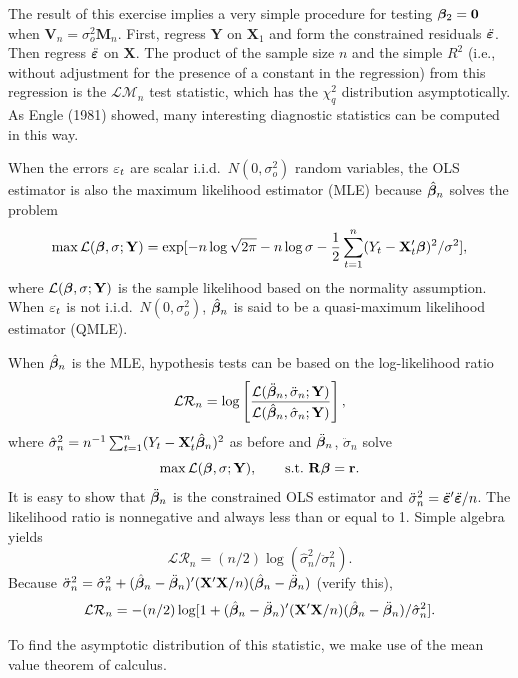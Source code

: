 The result of this exercise implies a very simple procedure for testing
$\boldsymbol{\beta}_2 = \mathbf{0}$ when $\mathbf{V}_n = \sigma_o^2\mathbf{M}_n$. First, regress $\mathbf{Y}$ on $\mathbf{X}_1$ and form the constrained
residuals $\ddot{\boldsymbol{\varepsilon}}$. Then regress $\ddot{\boldsymbol{\varepsilon}}$ on $\mathbf{X}$. The product of the sample size $n$ and the
simple $R^2$ (i.e., without adjustment for the presence of a constant in the
regression) from this regression is the $\mathcal{LM}_n$ test statistic, which has the
$\chi_q^2$ distribution asymptotically. As Engle (1981) showed, many interesting
diagnostic statistics can be computed in this way.

When the errors $\varepsilon_t$ are scalar i.i.d.\ $N(0, \sigma_o^2)$ random variables, the OLS
estimator is also the maximum likelihood estimator (MLE) because $\hat{\boldsymbol{\beta}}_n$
solves the problem
\[
\max \mathcal{L}(\boldsymbol{\beta}, \sigma; \mathbf{Y}) = \exp[-n\log\sqrt{2\pi} - n\log\sigma - \frac{1}{2}\sum_{t=1}^{n}(Y_t - \mathbf{X}_t'\boldsymbol{\beta})^2/\sigma^2],
\]
where $\mathcal{L}(\boldsymbol{\beta}, \sigma; \mathbf{Y})$ is the sample likelihood based on the normality assumption. When $\varepsilon_t$ is not i.i.d.\ $N(0, \sigma_o^2)$, $\hat{\boldsymbol{\beta}}_n$ is said to be a quasi-maximum
likelihood estimator (QMLE).

When $\hat{\boldsymbol{\beta}}_n$ is the MLE, hypothesis tests can be based on the log-likelihood
ratio
\[
\mathcal{LR}_n = \log\left[\frac{\mathcal{L}(\ddot{\boldsymbol{\beta}}_n, \ddot{\sigma}_n; \mathbf{Y})}{\mathcal{L}(\hat{\boldsymbol{\beta}}_n, \hat{\sigma}_n; \mathbf{Y})}\right],
\]
where $\hat{\sigma}_n^2 = n^{-1}\sum_{t=1}^{n}(Y_t - \mathbf{X}_t'\hat{\boldsymbol{\beta}}_n)^2$ as before and $\ddot{\boldsymbol{\beta}}_n$, $\ddot{\sigma}_n$ solve
\[
\max \mathcal{L}(\boldsymbol{\beta}, \sigma; \mathbf{Y}), \qquad \text{s.t.}\ \mathbf{R}\boldsymbol{\beta} = \mathbf{r}.
\]
It is easy to show that $\ddot{\boldsymbol{\beta}}_n$ is the constrained OLS estimator and $\ddot{\sigma}_n^2 = \ddot{\boldsymbol{\varepsilon}}'\ddot{\boldsymbol{\varepsilon}}/n$.
The likelihood ratio is nonnegative and always less than or equal
to 1. Simple algebra yields
\[
\mathcal{LR}_n = (n/2)\log(\hat{\sigma}_n^2/\ddot{\sigma}_n^2).
\]
Because $\ddot{\sigma}_n^2 = \hat{\sigma}_n^2 + (\hat{\boldsymbol{\beta}}_n - \ddot{\boldsymbol{\beta}}_n)'(\mathbf{X}'\mathbf{X}/n)(\hat{\boldsymbol{\beta}}_n - \ddot{\boldsymbol{\beta}}_n)$ (verify this),
\[
\mathcal{LR}_n = -(n/2)\log[1 + (\hat{\boldsymbol{\beta}}_n - \ddot{\boldsymbol{\beta}}_n)'(\mathbf{X}'\mathbf{X}/n)(\hat{\boldsymbol{\beta}}_n - \ddot{\boldsymbol{\beta}}_n)/\hat{\sigma}_n^2].
\]

To find the asymptotic distribution of this statistic, we make use of the
mean value theorem of calculus.

